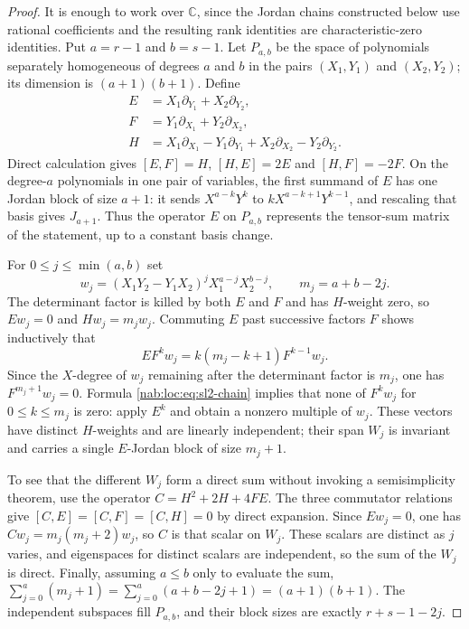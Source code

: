 \documentclass[11pt,letterpaper]{article}
\theoremstyle{definition}
\theoremstyle{remark}
\newcommand{\C}{\mathbb C}
\numberwithin{equation}{section}
\begin{document}
\begin{proof}
It is enough to work over $\C$, since the Jordan chains constructed below use
rational coefficients and the resulting rank identities are
characteristic-zero identities. Put $a=r-1$ and $b=s-1$. Let $P_{a,b}$ be the
space of polynomials separately homogeneous of degrees $a$ and $b$ in the pairs
$(X_1,Y_1)$ and $(X_2,Y_2)$; its dimension is $(a+1)(b+1)$. Define
\begin{align*}
 E&=X_1\partial_{Y_1}+X_2\partial_{Y_2},\\
 F&=Y_1\partial_{X_1}+Y_2\partial_{X_2},\\
 H&=X_1\partial_{X_1}-Y_1\partial_{Y_1}+X_2\partial_{X_2}-Y_2\partial_{Y_2}.
\end{align*}
Direct calculation gives $[E,F]=H$, $[H,E]=2E$ and $[H,F]=-2F$. On the
degree-$a$ polynomials in one pair of variables, the first summand of $E$ has
one Jordan block of size $a+1$: it sends $X^{a-k}Y^k$ to $kX^{a-k+1}Y^{k-1}$,
and rescaling that basis gives $J_{a+1}$. Thus the operator $E$ on $P_{a,b}$
represents the tensor-sum matrix of the statement, up to a constant basis
change.

For $0\leq j\leq\min(a,b)$ set
\[
 w_j=(X_1Y_2-Y_1X_2)^jX_1^{a-j}X_2^{b-j},\qquad m_j=a+b-2j.
\]
The determinant factor is killed by both $E$ and $F$ and has $H$-weight zero,
so $Ew_j=0$ and $Hw_j=m_jw_j$. Commuting $E$ past successive factors $F$ shows
inductively that
\begin{equation}\label{nab:loc:eq:sl2-chain}
 EF^kw_j=k(m_j-k+1)F^{k-1}w_j.
\end{equation}
Since the $X$-degree of $w_j$ remaining after the determinant factor is $m_j$,
one has $F^{m_j+1}w_j=0$. Formula \eqref{nab:loc:eq:sl2-chain} implies that none
of $F^kw_j$ for $0\leq k\leq m_j$ is zero: apply $E^k$ and obtain a nonzero
multiple of $w_j$. These vectors have distinct $H$-weights and are linearly
independent; their span $W_j$ is invariant and carries a single $E$-Jordan block
of size $m_j+1$.

To see that the different $W_j$ form a direct sum without invoking a
semisimplicity theorem, use the operator $C=H^2+2H+4FE$. The three commutator
relations give $[C,E]=[C,F]=[C,H]=0$ by direct expansion. Since $Ew_j=0$, one
has $Cw_j=m_j(m_j+2)w_j$, so $C$ is that scalar on $W_j$. These scalars are
distinct as $j$ varies, and eigenspaces for distinct scalars are independent,
so the sum of the $W_j$ is direct. Finally, assuming $a\leq b$ only to evaluate
the sum, $\sum_{j=0}^{a}(m_j+1)=\sum_{j=0}^{a}(a+b-2j+1)=(a+1)(b+1)$. The
independent subspaces fill $P_{a,b}$, and their block sizes are exactly
$r+s-1-2j$.
\end{proof}
\end{document}
